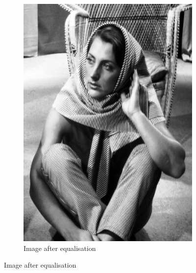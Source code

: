 \documentclass[a4paper]{article}
\begin{document}
\begin{figure}[h!]
\begin{subfigure}[b]{0.3\textwidth}
                \includegraphics[width=\textwidth]{q4-equal.png}
                \caption{Image after equalisation}
                \label{fig:ae}
        \end{subfigure}
        

\end{figure}
\end{document}
